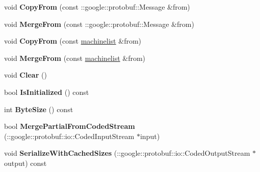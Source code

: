 \begin{DoxyCompactItemize}
\item 
void {\bfseries Copy\+From} (const \+::google\+::protobuf\+::\+Message \&from)\hypertarget{classmachines_1_1machinelist_a0c71c10f5fa4b0bc27e2d9391390989c}{}\label{classmachines_1_1machinelist_a0c71c10f5fa4b0bc27e2d9391390989c}

\item 
void {\bfseries Merge\+From} (const \+::google\+::protobuf\+::\+Message \&from)\hypertarget{classmachines_1_1machinelist_a62f63ba0763749be29e474c442278c7e}{}\label{classmachines_1_1machinelist_a62f63ba0763749be29e474c442278c7e}

\item 
void {\bfseries Copy\+From} (const \hyperlink{classmachines_1_1machinelist}{machinelist} \&from)\hypertarget{classmachines_1_1machinelist_a8a33c2bf4c500cb522a8c53a7d64cc52}{}\label{classmachines_1_1machinelist_a8a33c2bf4c500cb522a8c53a7d64cc52}

\item 
void {\bfseries Merge\+From} (const \hyperlink{classmachines_1_1machinelist}{machinelist} \&from)\hypertarget{classmachines_1_1machinelist_a05e4bd84e79d8bbbe89fa1a2862f0f2e}{}\label{classmachines_1_1machinelist_a05e4bd84e79d8bbbe89fa1a2862f0f2e}

\item 
void {\bfseries Clear} ()\hypertarget{classmachines_1_1machinelist_a5f678f33985b00a024ac236c9183cc58}{}\label{classmachines_1_1machinelist_a5f678f33985b00a024ac236c9183cc58}

\item 
bool {\bfseries Is\+Initialized} () const \hypertarget{classmachines_1_1machinelist_a492155d49225019237ef7064c64ff670}{}\label{classmachines_1_1machinelist_a492155d49225019237ef7064c64ff670}

\item 
int {\bfseries Byte\+Size} () const \hypertarget{classmachines_1_1machinelist_ad709a4a55106ea019e42eed22625db49}{}\label{classmachines_1_1machinelist_ad709a4a55106ea019e42eed22625db49}

\item 
bool {\bfseries Merge\+Partial\+From\+Coded\+Stream} (\+::google\+::protobuf\+::io\+::\+Coded\+Input\+Stream $\ast$input)\hypertarget{classmachines_1_1machinelist_a09677a174779b289c58dbf62c479101e}{}\label{classmachines_1_1machinelist_a09677a174779b289c58dbf62c479101e}

\item 
void {\bfseries Serialize\+With\+Cached\+Sizes} (\+::google\+::protobuf\+::io\+::\+Coded\+Output\+Stream $\ast$output) const \hypertarget{classmachines_1_1machinelist_a447136b85daa916e3153b9330ebbcb20}{}\label{classmachines_1_1machinelist_a447136b85daa916e3153b9330ebbcb20}


\end{DoxyCompactItemize}
